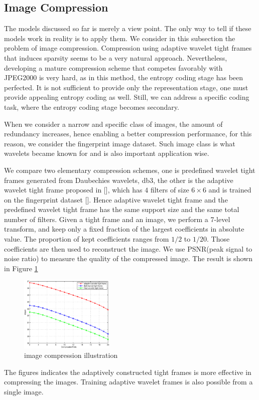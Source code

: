\documentclass[a4paper]{article}
\begin{document}
\subsection{Image Compression}
The models discussed so far is merely a view point. The only way to tell if these models work in reality is to apply them. We consider in this subsection the problem of image compression. Compression using adaptive wavelet tight frames that induces sparsity seems to be a very natural approach. Nevertheless, developing a mature compression scheme that competes favorably with JPEG2000 is very hard, as in this method, the entropy coding stage has been perfected. It is not sufficient to provide only the representation stage, one must provide appealing entropy coding as well. Still, we can address a specific coding task, where the entropy coding stage becomes secondary. 

When we consider a narrow and specific class of images, the amount of redundancy increases, hence enabling a better compression performance, for this reason, we consider the fingerprint image dataset. Such image class is what wavelets became known for and is also important application wise.

We compare two elementary compression schemes, one is predefined wavelet tight frames generated from Daubechies wavelets, db3, the other is the adaptive wavelet tight frame proposed in [], which has $4$ filters of size $6\times 6$ and is trained on the fingerprint dataset [].  Hence adaptive wavelet tight frame and the predefined wavelet tight frame has the same support size and the same total number of filters.  Given a tight frame and an image, we perform a 7-level transform, and keep only a fixed fraction of the largest coefficients in absolute value. The proportion of kept coefficients ranges from $1/2$ to $1/20$. Those coefficients are then used to reconstruct the image. We use PSNR(peak signal to noise ratio) to measure the quality of the compressed image. The result is shown in Figure \ref{fig:3}
\begin{figure}[h!]
    \centering
    \includegraphics[width=0.4\textwidth]{figure51.eps}
    \caption{image compression illustration}
    \label{fig:3}
\end{figure}
The figures indicates the adaptively constructed tight frames is more effective in compressing the images. Training adaptive wavelet frames is also possible from a single image.
\end{document}
